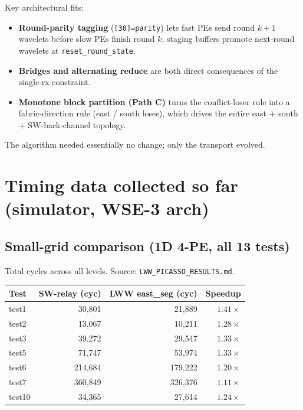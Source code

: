 \documentclass[11pt]{article}
\newcommand{\code}[1]{\texttt{#1}}
\newcommand{\file}[1]{\texttt{#1}}
\begin{document}
Key architectural fits:

\begin{itemize}[leftmargin=1.3em,itemsep=0.2em]
  \item \textbf{Round-parity tagging} (\code{[30]=parity}) lets
    fast PEs send round $k{+}1$ wavelets before slow PEs finish
    round $k$; staging buffers promote next-round wavelets at
    \code{reset\_round\_state}.
  \item \textbf{Bridges and alternating reduce} are both direct
    consequences of the single-rx constraint.
  \item \textbf{Monotone block partition (Path C)} turns the
    conflict-loser rule into a fabric-direction rule (east /
    south loses), which drives the entire east $+$ south $+$
    SW-back-channel topology.
\end{itemize}

The algorithm needed essentially no change; only the transport
evolved.

\section{Timing data collected so far (simulator, WSE-3 arch)}

\subsection{Small-grid comparison (1D 4-PE, all 13 tests)}
\label{sec:timing-1d}

Total cycles across all levels. Source:
\file{LWW\_PICASSO\_RESULTS.md}.

\begin{center}
\begin{tabular}{l r r r}
\toprule
Test & SW-relay (cyc) & LWW east\_seg (cyc) & Speedup \\
\midrule
test1 & 30,801 & 21,889 & $1.41\times$ \\
test2 & 13,067 & 10,211 & $1.28\times$ \\
test3 & 39,272 & 29,547 & $1.33\times$ \\
test5 & 71,747 & 53,974 & $1.33\times$ \\
test6 & 214,684 & 179,222 & $1.20\times$ \\
test7 & 360,849 & 326,376 & $1.11\times$ \\
test10 & 34,365 & 27,614 & $1.24\times$ \\
\bottomrule
\end{tabular}
\end{center}
\end{document}
